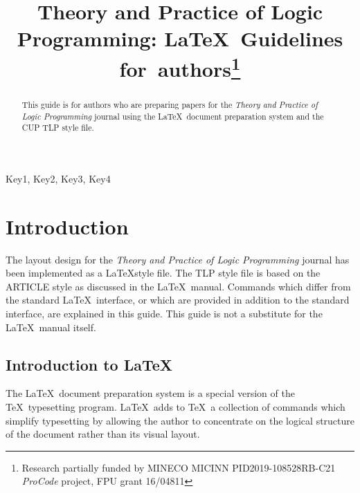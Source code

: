 \documentclass{tlp}
\begin{document}


\title[Theory and Practice of Logic Programming]{Theory and Practice of Logic Programming: \LaTeX\ Guidelines for~authors\thanks{Research partially funded by
      MINECO
      MICINN PID2019-108528RB-C21 \emph{ProCode} project, FPU grant
      16/04811}}

\begin{authgrp}
\author{ }
\author{ }
\end{authgrp}


\maketitle

\begin{abstract}
This guide is for authors who are preparing papers for the {\em Theory and Practice of Logic Programming} journal using the \LaTeX\ document preparation
system and the CUP TLP style file.
\end{abstract}

\begin{keywords}
Key1, Key2, Key3, Key4
\end{keywords}


\section{Introduction}

The layout design for the {\em Theory and Practice of Logic Programming} journal
has been implemented as a \LaTeX style file. The TLP style file is based
on the ARTICLE style as discussed in the \LaTeX\ manual. Commands which
differ from the standard \LaTeX\ interface, or which are provided in addition
to the standard interface, are explained in this guide. This guide is not a
substitute for the \LaTeX\ manual itself.

\subsection{Introduction to \LaTeX}

The \LaTeX\ document preparation system is a special version of the
\TeX\ typesetting program. \LaTeX\ adds to \TeX\ a collection of
commands which simplify typesetting by allowing the author to
concentrate on the logical structure of the document rather than
its visual layout.
\end{document}

